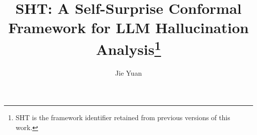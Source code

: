 \documentclass[runningheads]{llncs}
\begin{document}
\title{SHT: A Self-Surprise Conformal Framework for LLM Hallucination Analysis\thanks{SHT is the framework identifier retained from previous versions of this work.}}

\author{Jie Yuan}



\maketitle
\end{document}
